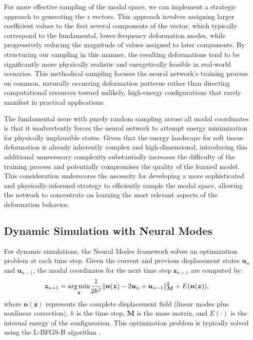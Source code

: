 For more effective sampling of the modal space, we can implement a strategic approach to generating the \(z\) vectors. This approach involves assigning larger coefficient values to the first several components of the vector, which typically correspond to the fundamental, lower-frequency deformation modes, while progressively reducing the magnitude of values assigned to later components. By structuring our sampling in this manner, the resulting deformations tend to be significantly more physically realistic and energetically feasible in real-world scenarios. This methodical sampling focuses the neural network's training process on common, naturally occurring deformation patterns rather than directing computational resources toward unlikely, high-energy configurations that rarely manifest in practical applications.

The fundamental issue with purely random sampling across all modal coordinates is that it inadvertently forces the neural network to attempt energy minimization for physically implausible states. Given that the energy landscape for soft tissue deformation is already inherently complex and high-dimensional, introducing this additional unnecessary complexity substantially increases the difficulty of the training process and potentially compromises the quality of the learned model. This consideration underscores the necessity for developing a more sophisticated and physically-informed strategy to efficiently sample the modal space, allowing the network to concentrate on learning the most relevant aspects of the deformation behavior.


\subsection{Dynamic Simulation with Neural Modes}
For dynamic simulations, the Neural Modes framework solves an optimization problem at each time step. Given the current and previous displacement states $\bm{u}_n$ and $\bm{u}_{n-1}$, the modal coordinates for the next time step $\bm{z}_{n+1}$ are computed by:
\begin{equation}
    \bm{z}_{n+1} = \underset{\bm{z}}{\operatorname*{arg\,min}} \frac{1}{2h^2} \|\bm{n}(\bm{z}) - 2\bm{u}_n + \bm{u}_{n-1}\|_{\bm{M}}^2 + E(\bm{n}(\bm{z})),
    \label{eq:optimization_problem}
\end{equation}
where $\bm{n}(\bm{z})$ represents the complete displacement field (linear modes plus nonlinear correction), $h$ is the time step, $\bm{M}$ is the mass matrix, and $E(\cdot)$ is the internal energy of the configuration. This optimization problem is typically solved using the L-BFGS-B algorithm \cite{Liu_1989}.

